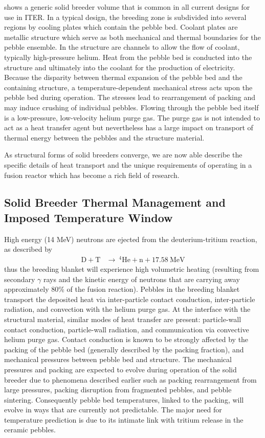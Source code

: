  shows a generic solid breeder volume that is common in all current designs for use in ITER. In a typical design, the breeding zone is subdivided into several regions by cooling plates which contain the pebble bed. Coolant plates are metallic structure which serve as both mechanical and thermal boundaries for the pebble ensemble. In the structure are channels to allow the flow of coolant, typically high-pressure helium. Heat from the pebble bed is conducted into the structure and ultimately into the coolant for the production of electricity. Because the disparity between thermal expansion of the pebble bed and the containing structure, a temperature-dependent mechanical stress acts upon the pebble bed during operation. The stresses lead to rearrangement of packing and may induce crushing of individual pebbles. Flowing through the pebble bed itself is a low-pressure, low-velocity helium purge gas. The purge gas is not intended to act as a heat transfer agent but nevertheless has a large impact on transport of thermal energy between the pebbles and the structure material.

As structural forms of solid breeders converge, we are now able describe the specific details of heat transport and the unique requirements of operating in a fusion reactor which has become a rich field of research.

\subsection{Solid Breeder Thermal Management and Imposed Temperature Window}
High energy (14 MeV) neutrons are ejected from the deuterium-tritium reaction, as described by 
\begin{align}
    \mathrm{D} + \mathrm{T}&\xrightarrow{}\ ^4\mathrm{He}+\mathrm{n}+17.58\ \text{MeV} \label{eq:dt-reaction}
\end{align}
thus the breeding blanket will experience high volumetric heating (resulting from secondary $\gamma$ rays and the kinetic energy of neutrons that are carrying away approximately 80\% of the fusion reaction). Pebbles in the breeding blanket transport the deposited heat via inter-particle contact conduction, inter-particle radiation, and convection with the helium purge gas. At the interface with the structural material, similar modes of heat transfer are present: particle-wall contact conduction, particle-wall radiation, and communication via convective helium purge gas. Contact conduction is known to be strongly affected by the packing of the pebble bed (generally described by the packing fraction), and mechanical pressures between pebble bed and structure. The mechanical pressures and packing are expected to evolve during operation of the solid breeder due to phenomena described earlier such as packing rearrangement from large pressures, packing disruption from fragmented pebbles, and pebble sintering. Consequently pebble bed temperatures, linked to the packing, will evolve in ways that are currently not predictable. The major need for temperature prediction is due to its intimate link with tritium release in the ceramic pebbles.

